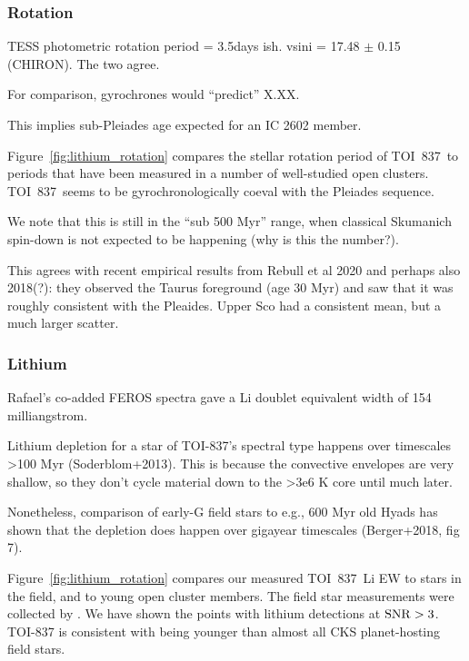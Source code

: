 \documentclass[12pt,twocolumn,tighten]{aastex62}
\newcommand{\tn}{TOI~837} %
\begin{document}
\subsubsection{Rotation}

TESS photometric rotation period = 3.5days ish.
vsini = 17.48 $\pm$ 0.15 (CHIRON).
The two agree.

For comparison, gyrochrones would ``predict'' X.XX.

This implies sub-Pleiades age expected for an IC 2602 member.

Figure~\ref{fig:lithium_rotation} compares the stellar rotation period of \tn\ to
periods that have been measured in a number of well-studied open clusters.
\tn\ seems to be gyrochronologically coeval with the Pleiades sequence.

We note that this is still in the ``sub 500 Myr'' range, when classical
Skumanich spin-down is not expected to be happening (why is this the number?).

This agrees with recent empirical results from Rebull et al 2020 and perhaps also 2018(?):
they observed the Taurus foreground (age 30 Myr) and saw that it was 
roughly consistent with the Pleaides.
Upper Sco had a consistent mean, but a much larger scatter.



\subsubsection{Lithium}

Rafael's co-added FEROS spectra gave a Li doublet equivalent width of
154 milliangstrom.

Lithium depletion for a star of TOI-837's spectral type happens
over timescales >100 Myr (Soderblom+2013). This is because the
convective envelopes are very shallow, so they don't cycle material
down to the >3e6 K core until much later.

Nonetheless, comparison of early-G field stars to e.g., 600 Myr old
Hyads has shown that the depletion does happen over gigayear timescales
(Berger+2018, fig 7).

Figure~\ref{fig:lithium_rotation} compares our measured \tn\ Li EW 
to stars in the field, and to young open cluster members.
The field star measurements were collected by
\citet{berger_identifying_2018}.
We have shown the points with lithium detections at ${\rm SNR}>3$.
TOI-837 is consistent with being younger than almost all CKS
planet-hosting field stars.
\end{document}
